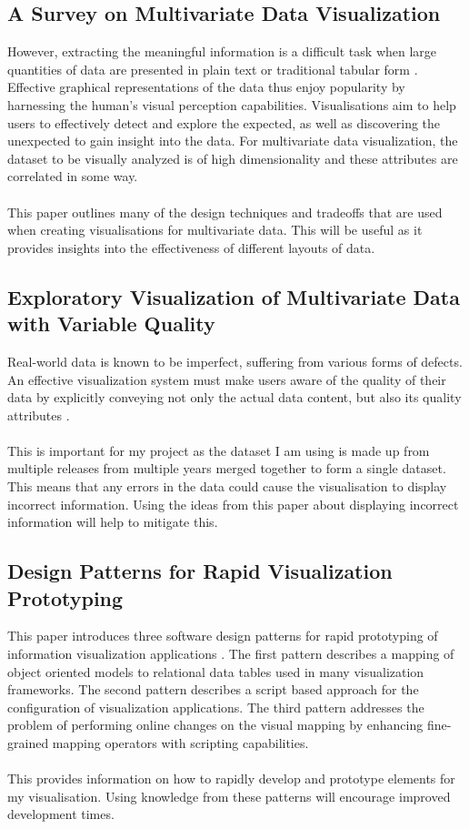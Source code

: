 \documentclass[11pt
              , a4paper
              , twoside
              , openright
              ]{report}
\begin{document}
\subsection{A Survey on Multivariate Data Visualization}
However, extracting the meaningful information is a difficult task when large
quantities of data are presented in plain text or traditional tabular form 
\cite{chan}. Effective graphical representations of the data thus enjoy
popularity by harnessing the human’s visual perception capabilities.
Visualisations aim to help users to effectively detect and explore the expected,
as well as discovering the unexpected to gain insight into the data. For
multivariate data visualization, the dataset to be visually analyzed is of high
dimensionality and these attributes are correlated in some way.
\\\\
This paper outlines many of the design techniques and tradeoffs that are used
when creating visualisations for multivariate data. This will be useful as it
provides insights into the effectiveness of different layouts of data.
\subsection{Exploratory Visualization of Multivariate Data with Variable Quality
}
Real-world data is known to be imperfect, suffering from various forms of
defects. An effective visualization system must make users aware of the quality
of their data by explicitly conveying not only the actual data content, but also
its quality attributes \cite{huang}.
\\\\
This is important for my project as the dataset I am using is made up from
multiple releases from multiple years merged together to form a single dataset.
This means that any errors in the data could cause the visualisation to display
incorrect information. Using the ideas from this paper about displaying
incorrect information will help to mitigate this. 
\subsection{Design Patterns for Rapid Visualization Prototyping}
This paper introduces three software design patterns
for rapid prototyping of information visualization applications \cite{ertl}.
The first pattern describes a mapping of object oriented
models to relational data tables used in many visualization
frameworks. The second pattern describes a script
based approach for the configuration of visualization applications.
The third pattern addresses the problem of performing
online changes on the visual mapping by enhancing
fine-grained mapping operators with scripting capabilities.
\\\\
This provides information on how to rapidly develop and prototype elements for
my visualisation. Using knowledge from these patterns will encourage improved
development times.
\end{document}
